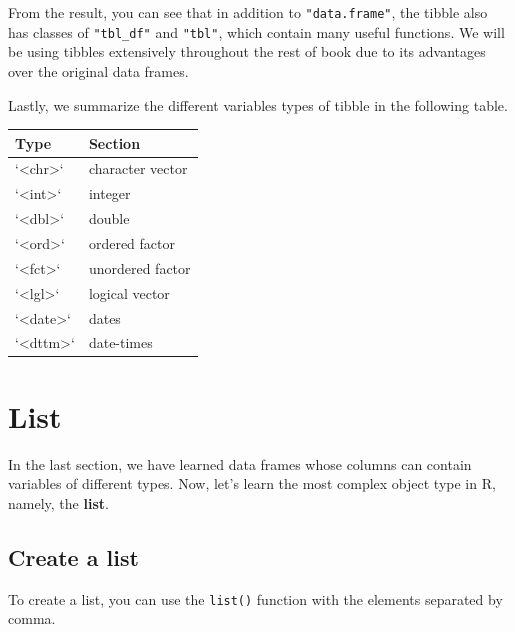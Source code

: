 \documentclass[
]{book}
\begin{document}
From the result, you can see that in addition to \texttt{"data.frame"}, the tibble also has classes of \texttt{"tbl\_df"} and \texttt{"tbl"}, which contain many useful functions. We will be using tibbles extensively throughout the rest of book due to its advantages over the original data frames.

Lastly, we summarize the different variables types of tibble in the following table.

\begin{tabular}{l|l}
\hline
Type & Section\\
\hline
`<chr>` & character vector\\
\hline
`<int>` & integer\\
\hline
`<dbl>` & double\\
\hline
`<ord>` & ordered factor\\
\hline
`<fct>` & unordered factor\\
\hline
`<lgl>` & logical vector\\
\hline
`<date>` & dates\\
\hline
`<dttm>` & date-times\\
\hline
\end{tabular}

\hypertarget{list}{%
\section{List}\label{list}}

In the last section, we have learned data frames whose columns can contain variables of different types. Now, let's learn the most complex object type in R, namely, the \textbf{list}.

\hypertarget{create-a-list}{%
\subsection{Create a list}\label{create-a-list}}

To create a list, you can use the \texttt{list()} function with the elements separated by comma.
\end{document}
